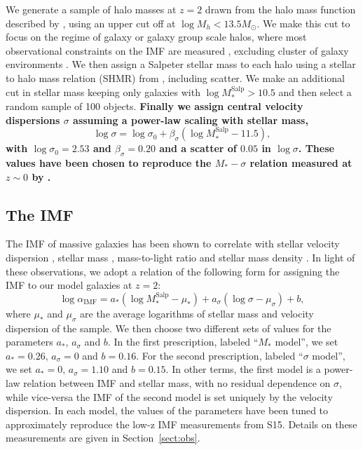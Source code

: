 \documentclass[usenatbib, letters]{mnras}
\def\msalp{M_*^{\mathrm{Salp}}}
\def\aimf{\alpha_{\mathrm{IMF}}}
\def\Sref#1{Section~\ref{#1}\xspace}
\begin{document}
We generate a sample of halo masses at $z=2$ drawn from the halo mass function described by \citet{Tin++08}, using an upper cut off at $\log{M_h} < 13.5M_\odot$.
We make this cut to focus on the regime of galaxy or galaxy group scale halos, where most observational constraints on the IMF are measured \citep{Gav++07}, excluding cluster of galaxy environments \citep[though IMF constraints are available for some brightest cluster galaxies][]{New++13}.
We then assign a Salpeter stellar mass to each halo using a stellar to halo mass relation (SHMR) from \citet{Lea++12}, including scatter.
We make an additional cut in stellar mass keeping only galaxies with $\log{\msalp} > 10.5$ and then select a random sample of 100 objects.
{\bf Finally we assign central velocity dispersions $\sigma$ assuming a power-law scaling with stellar mass,
\begin{equation}\label{eq:mason}
\log{\sigma} = \log{\sigma_0} + \beta_\sigma(\log{\msalp} - 11.5), 
\end{equation}
with $\log{\sigma_0}=2.53$ and $\beta_\sigma=0.20$ and a scatter of $0.05$ in $\log{\sigma}$. These values have been chosen to reproduce the $M_*-\sigma$ relation measured at $z\sim0$ by \citet{Aug++10}.}

\subsection{The IMF}
\label{ssect:imfform}

The IMF of massive galaxies has been shown to correlate with stellar velocity dispersion \citep[e.g.][]{Tre++10, CvD12, LaB++13, Spi++14, Pos++15}, stellar mass \citep{Aug++10b, Son++15}, mass-to-light ratio \citep{Cap++12} and stellar mass density \citep{Spi++15}.
In light of these observations, we adopt a relation of the following form for assigning the IMF to our model galaxies at $z=2$:
\begin{equation}\label{eq:imfform}
\log{\aimf} = a_*(\log{\msalp} - \mu_*) + a_\sigma(\log{\sigma} - \mu_\sigma) + b,
\end{equation}
where $\mu_*$ and $\mu_\sigma$ are the average logarithms of stellar mass and velocity dispersion of the sample.
We then choose two different sets of values for the parameters $a_*$, $a_\sigma$ and $b$. In the first prescription, labeled ``$M_*$ model'', we set $a_*=0.26$, $a_\sigma=0$ and $b=0.16$.
For the second prescription, labeled ``$\sigma$ model'', we set $a_*=0$, $a_\sigma=1.10$ and $b=0.15$.
In other terms, the first model is a power-law relation between IMF and stellar mass, with no residual dependence on $\sigma$, while vice-versa the IMF of the second model is set uniquely by the velocity dispersion.
In each model, the values of the parameters have been tuned to approximately reproduce the low-z IMF measurements from S15. Details on these measurements are given in \Sref{sect:obs}.
\end{document}
